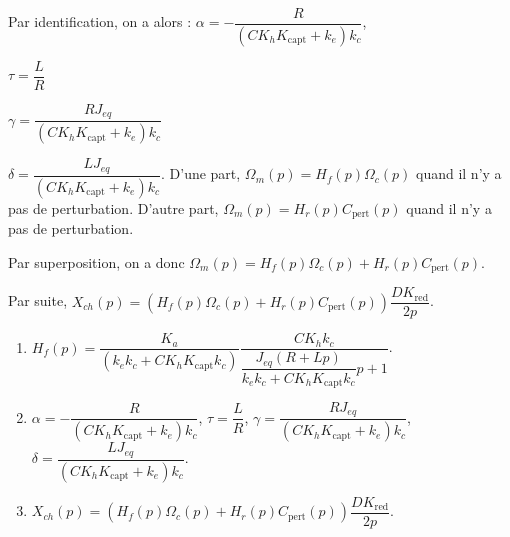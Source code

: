 \begin{corrigebox}
 Par identification, on a alors : 
 $\alpha = - \dfrac{R}{\left( C K_h K_{\text{capt}}+k_e\right) k_c}$, 

 $\tau = \dfrac{L}{R}$

$\gamma = \dfrac{R J_{eq}}{\left( C K_h K_{\text{capt}}+k_e\right) k_c} $

$\delta = \dfrac{LJ_{eq}}{\left( C K_h K_{\text{capt}}+k_e\right) k_c}$.
D'une part, $\Omega_m(p) = H_f(p) \Omega_c(p)$ quand il n'y a pas de perturbation.
D'autre part, $\Omega_m(p) = H_r(p) C_{\text{pert}}(p)$ quand il n'y a pas de perturbation.

Par superposition, on a donc $\Omega_m(p) = H_f(p) \Omega_c(p) + H_r(p) C_{\text{pert}}(p)$.

Par suite, $X_{ch}(p)=\left(H_f(p) \Omega_c(p) + H_r(p) C_{\text{pert}}(p)\right) \dfrac{DK_{\text{red}}}{2p}$.

\begin{enumerate}
\item $ H_f(p)=
\dfrac{K_a }{\left( k_ek_c+CK_hK_{\text{capt}} k_c\right)} \dfrac{CK_h k_c}{\dfrac{J_{eq}\left(R+Lp\right)}{k_ek_c+CK_hK_{\text{capt}} k_c}p+1} $.
\item  $\alpha = - \dfrac{R}{\left( C K_h K_{\text{capt}}+k_e\right) k_c}$,  $\tau = \dfrac{L}{R}$, 
$\gamma = \dfrac{R J_{eq}}{\left( C K_h K_{\text{capt}}+k_e\right) k_c} $, 
$\delta = \dfrac{LJ_{eq}}{\left( C K_h K_{\text{capt}}+k_e\right) k_c}$.
\item $X_{ch}(p)=\left(H_f(p) \Omega_c(p) + H_r(p) C_{\text{pert}}(p)\right) \dfrac{DK_{\text{red}}}{2p}$.
\end{enumerate}
\end{corrigebox}
